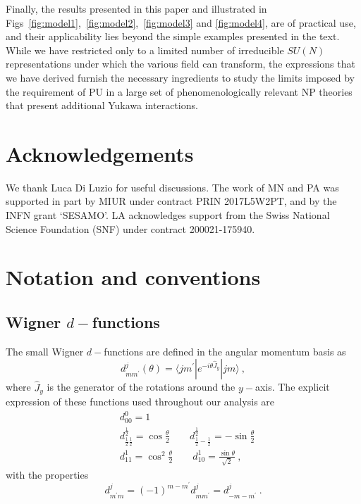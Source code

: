 \documentclass[a4paper,11pt]{article}
\newcommand{\be}{\begin{equation}}
\newcommand{\ee}{\end{equation}}
\newcommand{\nn}{\nonumber}
\begin{document}
Finally, the results presented in this paper and illustrated in Figs~\ref{fig:model1},~\ref{fig:model2},~\ref{fig:model3} and \ref{fig:model4},
 are of practical use, and their applicability lies beyond the simple examples presented in the text. While we have restricted only to a limited number of irreducible $SU(N)$ representations under which the various field can transform, 
the expressions that we have derived furnish the necessary ingredients to study the limits imposed by the requirement of PU in a large set of phenomenologically relevant NP theories that present additional Yukawa interactions.






\section*{Acknowledgements}
We thank Luca Di Luzio for useful discussions. The work of MN and PA was supported in part by MIUR under contract PRIN 2017L5W2PT, and by the INFN grant ‘SESAMO’. LA acknowledges support from the Swiss National Science Foundation (SNF) under contract 200021-175940.


\appendix
\section{Notation and conventions}\label{app:conventions}

\subsection{Wigner $d-$functions}\label{app:wig}

The small Wigner $d-$functions are defined in the angular momentum basis as
\be
d^j_{m m^\prime}(\theta) = \langle j m^\prime | e^{-i \theta \hat J_y} | j m \rangle  \ ,
\ee
where $\hat J_y$ is the generator of the rotations around the $y-$axis. The explicit expression of these functions used throughout our analysis are
\begin{align}
& d^0_{00}=1 \nn \\
%
& d^{\frac{1}{2}}_{\frac{1}{2}\frac{1}{2}}=\cos\frac{\theta}{2} \qquad d^{\frac{1}{2}}_{\frac{1}{2}-\frac{1}{2}}=-\sin\frac{\theta}{2}\nn \\
%
& d^1_{11}=\cos^2\frac{\theta}{2} \qquad d^1_{10}=\frac{\sin\theta}{\sqrt 2} \ ,
\end{align}
with the properties
\be
d^j_{m^\prime m} = (-1)^{m-m^\prime} d^j_{m m^\prime} = d^j_{-m -m^\prime} \ .
\ee
\end{document}
